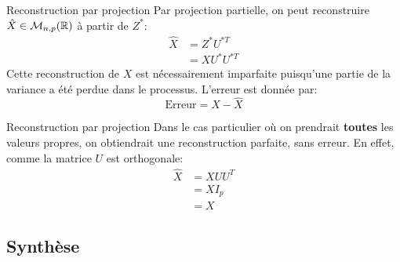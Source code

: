 \begin{frame}{Reconstruction par projection}
	Par projection partielle, on peut reconstruire $\hat{X} \in \mathcal{M}_{n,p}(\mathbb{R})$ à partir de $Z^*$:
	\begin{equation}
		\begin{aligned}
			\hat{X} &= Z^* U^{*T} \\
			        &= X U^* U^{*T}
		\end{aligned}
		\nonumber
	\end{equation}
	\pause
	Cette reconstruction de $X$ est nécessairement imparfaite puisqu'une partie de la variance a été perdue dans le processus. L'erreur est donnée par:
	\begin{equation}
		\text{Erreur} = X - \hat{X}
		\nonumber
	\end{equation}
\end{frame}

\begin{frame}{Reconstruction par projection}
	Dans le cas particulier où on prendrait \textbf{toutes} les valeurs propres, on obtiendrait une reconstruction parfaite, sans erreur. En effet, comme la matrice $U$ est orthogonale:
	\begin{equation}
		\begin{aligned}
			\hat{X} &= X U U^T \\
			        &= X I_p \\
			        &= X
		\end{aligned}
		\nonumber
	\end{equation}
\end{frame}

\subsection[Synthèse]{Synthèse}

